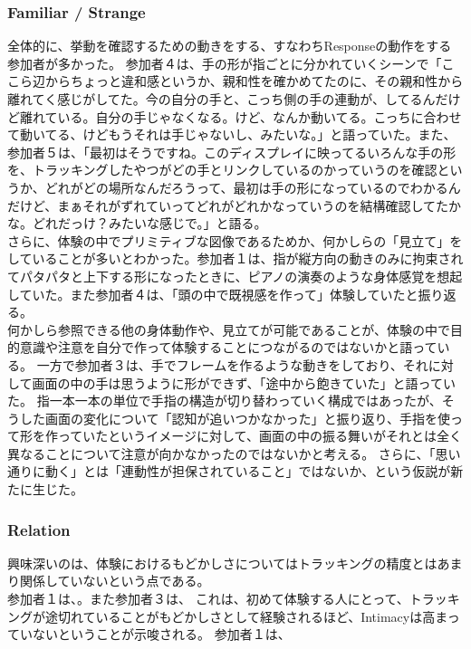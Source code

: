 \subsubsection{Familiar / Strange}
全体的に、挙動を確認するための動きをする、すなわちResponseの動作をする参加者が多かった。
参加者４は、手の形が指ごとに分かれていくシーンで「ここら辺からちょっと違和感というか、親和性を確かめてたのに、その親和性から離れてく感じがしてた。今の自分の手と、こっち側の手の連動が、してるんだけど離れている。自分の手じゃなくなる。けど、なんか動いてる。こっちに合わせて動いてる、けどもうそれは手じゃないし、みたいな。」と語っていた。また、参加者５は、「最初はそうですね。このディスプレイに映ってるいろんな手の形を、トラッキングしたやつがどの手とリンクしているのかっていうのを確認というか、どれがどの場所なんだろうって、最初は手の形になっているのでわかるんだけど、まぁそれがずれていってどれがどれかなっていうのを結構確認してたかな。どれだっけ？みたいな感じで。」と語る。\\
さらに、体験の中でプリミティブな図像であるためか、何かしらの「見立て」をしていることが多いとわかった。参加者１は、指が縦方向の動きのみに拘束されてパタパタと上下する形になったときに、ピアノの演奏のような身体感覚を想起していた。また参加者４は、「頭の中で既視感を作って」体験していたと振り返る。\\
何かしら参照できる他の身体動作や、見立てが可能であることが、体験の中で目的意識や注意を自分で作って体験することにつながるのではないかと語っている。
一方で参加者３は、手でフレームを作るような動きをしており、それに対して画面の中の手は思うように形ができず、「途中から飽きていた」と語っていた。
指一本一本の単位で手指の構造が切り替わっていく構成ではあったが、そうした画面の変化について「認知が追いつかなかった」と振り返り、手指を使って形を作っていたというイメージに対して、画面の中の振る舞いがそれとは全く異なることについて注意が向かなかったのではないかと考える。
さらに、「思い通りに動く」とは「連動性が担保されていること」ではないか、という仮説が新たに生じた。
\subsubsection{Relation}
興味深いのは、体験におけるもどかしさについてはトラッキングの精度とはあまり関係していないという点である。\\
参加者１は、。また参加者３は、
これは、初めて体験する人にとって、トラッキングが途切れていることがもどかしさとして経験されるほど、Intimacyは高まっていないということが示唆される。
参加者１は、